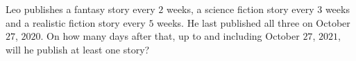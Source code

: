 Leo publishes a fantasy story every $2$ weeks, a science fiction story every $3$ weeks and a realistic fiction story every $5$ weeks. He last published all three on October $27$, $2020$. On how many days after that, up to and including October $27$, $2021$, will he publish at least one story?
